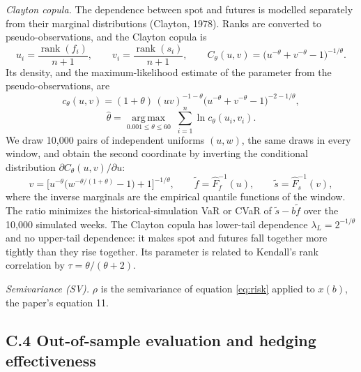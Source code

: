 \documentclass[11pt,letterpaper]{article}
\begin{document}
\textit{Clayton copula.} The dependence between spot and futures is modelled separately from their marginal distributions (Clayton, 1978). Ranks are converted to pseudo-observations, and the Clayton copula is
\begin{equation}
u_i = \frac{\operatorname{rank}(f_i)}{n+1}, \qquad v_i = \frac{\operatorname{rank}(s_i)}{n+1}, \qquad C_\theta(u,v) = \big(u^{-\theta} + v^{-\theta} - 1\big)^{-1/\theta}.
\end{equation}
Its density, and the maximum-likelihood estimate of the parameter from the pseudo-observations, are
\begin{equation}
c_\theta(u,v) = (1+\theta)\,(uv)^{-1-\theta}\big(u^{-\theta} + v^{-\theta} - 1\big)^{-2-1/\theta},
\end{equation}
\begin{equation}
\hat\theta = \operatorname*{arg\,max}_{0.001 \le \theta \le 60}\; \sum_{i=1}^{n} \ln c_\theta(u_i, v_i).
\end{equation}
We draw 10,000 pairs of independent uniforms $(u, w)$, the same draws in every window, and obtain the second coordinate by inverting the conditional distribution $\partial C_\theta(u,v)/\partial u$:
\begin{equation}
v = \Big[u^{-\theta}\big(w^{-\theta/(1+\theta)} - 1\big) + 1\Big]^{-1/\theta}, \qquad \tilde f = \hat F_f^{-1}(u), \qquad \tilde s = \hat F_s^{-1}(v),
\end{equation}
where the inverse marginals are the empirical quantile functions of the window. The ratio minimizes the historical-simulation VaR or CVaR of $\tilde s - b\tilde f$ over the 10,000 simulated weeks. The Clayton copula has lower-tail dependence $\lambda_L = 2^{-1/\theta}$ and no upper-tail dependence: it makes spot and futures fall together more tightly than they rise together. Its parameter is related to Kendall's rank correlation by $\tau = \theta/(\theta+2)$.

\textit{Semivariance (SV).} $\rho$ is the semivariance of equation \eqref{eq:risk} applied to $x(b)$, the paper's equation 11.

\subsection*{C.4 Out-of-sample evaluation and hedging effectiveness}
\end{document}
